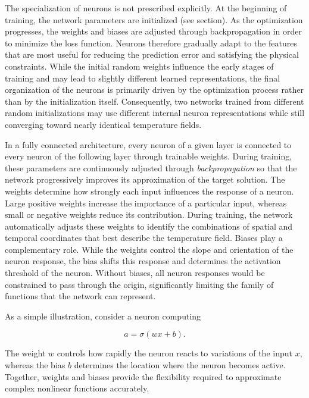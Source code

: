 The specialization of neurons is not prescribed explicitly. At the beginning of training, the network parameters are initialized (see section). As the optimization progresses, the weights and biases are adjusted through backpropagation in order to minimize the loss function. Neurons therefore gradually adapt to the features that are most useful for reducing the prediction error and satisfying the physical constraints. While the initial random weights influence the early stages of training and may lead to slightly different learned representations, the final organization of the neurons is primarily driven by the optimization process rather than by the initialization itself. Consequently, two networks trained from different random initializations may use different internal neuron representations while still converging toward nearly identical temperature fields.

In a fully connected architecture, every neuron of a given layer is connected to every neuron of the following layer through trainable weights. During training, these parameters are continuously adjusted through \textit{backpropagation} so that the network progressively improves its approximation of the target solution. The weights determine how strongly each input influences the response of a neuron. Large positive weights increase the importance of a particular input, whereas small or negative weights reduce its contribution. During training, the network automatically adjusts these weights to identify the combinations of spatial and temporal coordinates that best describe the temperature field. Biases play a complementary role. While the weights control the slope and orientation of the neuron response, the bias shifts this response and determines the activation threshold of the neuron. Without biases, all neuron responses would be constrained to pass through the origin, significantly limiting the family of functions that the network can represent.

As a simple illustration, consider a neuron computing

\begin{equation}
a = \sigma(wx+b).
\end{equation}

The weight $w$ controls how rapidly the neuron reacts to variations of the input $x$, whereas the bias $b$ determines the location where the neuron becomes active. Together, weights and biases provide the flexibility required to approximate complex nonlinear functions accurately.

